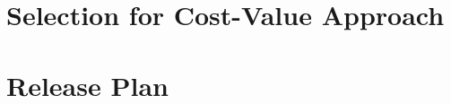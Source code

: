 \documentclass[../main.tex]{subfiles}
\begin{document}
	\chapter{Selection for Cost-Value Approach}
	\chapter{Release Plan}
\end{document}
